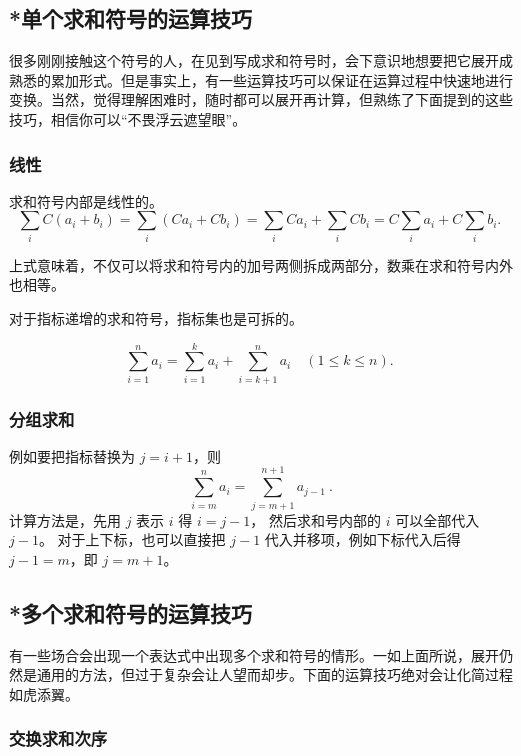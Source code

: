 \subsection{*单个求和符号的运算技巧}

很多刚刚接触这个符号的人，在见到写成求和符号时，会下意识地想要把它展开成熟悉的累加形式。但是事实上，有一些运算技巧可以保证在运算过程中快速地进行变换。当然，觉得理解困难时，随时都可以展开再计算，但熟练了下面提到的这些技巧，相信你可以“不畏浮云遮望眼”。

\subsubsection{线性}
求和符号内部是线性的。
\begin{equation}
\sum_{i} C(a_i + b_i) = \sum_{i} (Ca_i + Cb_i) =\sum_{i} Ca_i + \sum_{i} Cb_i=C\sum_{i} a_i + C\sum_{i} b_i.~
\end{equation}

上式意味着，不仅可以将求和符号内的加号两侧拆成两部分，数乘在求和符号内外也相等。

对于指标递增的求和符号，指标集也是可拆的。

\begin{equation}
\sum_{i=1}^n a_i  = \sum_{i=1}^k a_i  +\sum_{i=k+1}^n a_i \quad(1\leq k\leq n) .~
\end{equation}

\subsubsection{分组求和}

例如要把指标替换为 $j=i+1$，则
\begin{equation}
\sum_{i=m}^n a_i = \sum_{j=m+1}^{n+1} a_{j-1} ~.
\end{equation}
计算方法是，先用 $j$ 表示 $i$ 得 $i=j-1$， 然后求和号内部的 $i$ 可以全部代入 $j-1$。 对于上下标，也可以直接把 $j-1$ 代入并移项，例如下标代入后得 $j-1=m$，即 $j=m+1$。

\subsection{*多个求和符号的运算技巧}

有一些场合会出现一个表达式中出现多个求和符号的情形。一如上面所说，展开仍然是通用的方法，但过于复杂会让人望而却步。下面的运算技巧绝对会让化简过程如虎添翼。

\subsubsection{交换求和次序}

